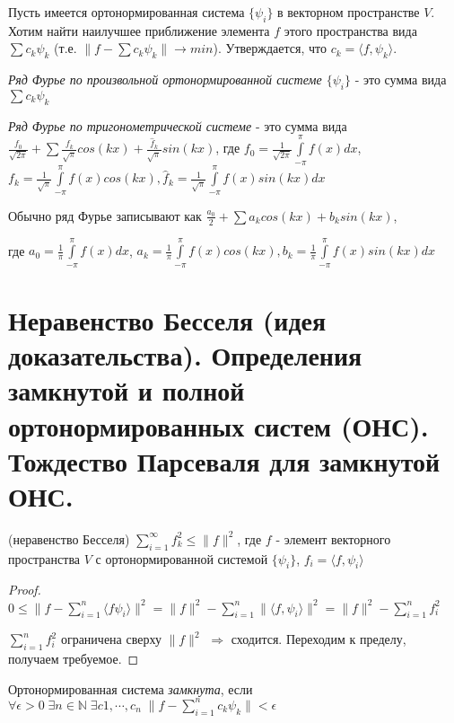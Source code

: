 \documentclass{article}
\begin{document}
	Пусть имеется ортонормированная система $\{{\psi_i}\}$ в векторном пространстве $V$. Хотим найти наилучшее приближение элемента $f$ этого пространства вида $\sum c_k \psi_k$ (т.е. $\|f-\sum c_k \psi_k\| \rightarrow min$). Утверждается, что $c_k=\langle f, \psi_k\rangle$.
	
	 \begin{definition}
	 	\textit{Ряд Фурье по произвольной ортонормированной системе $\{{\psi_i}\}$} - это сумма вида $\sum c_k \psi_k$
	 \end{definition}
 
	 \begin{definition}
	 	\textit{Ряд Фурье по тригонометрической системе} - это сумма вида $\frac{f_0}{\sqrt{2\pi}} +\sum \frac{f_k}{\sqrt{\pi}}cos(kx) + \frac{\hat f_k}{\sqrt{\pi}}sin(kx)$, где $f_0=\frac{1}{\sqrt{2\pi}}\int\limits_{-\pi}^{\pi} f(x) dx$, $f_k=\frac{1}{\sqrt{\pi}}\int\limits_{-\pi}^{\pi} f(x)cos(kx), \hat f_k=\frac{1}{\sqrt{\pi}}\int\limits_{-\pi}^{\pi} f(x)sin(kx) dx$
	 \end{definition}
 
 	Обычно ряд Фурье записывают как $\frac{a_0}{2} + \sum a_k cos(kx) + b_k sin(kx)$,
 	
 	где $a_0=\frac{1}{\pi}\int\limits_{-\pi}^{\pi} f(x) dx$, $a_k=\frac{1}{\pi}\int\limits_{-\pi}^{\pi} f(x)cos(kx), b_k=\frac{1}{\pi}\int\limits_{-\pi}^{\pi} f(x)sin(kx) dx$
	
	\section{Неравенство Бесселя (идея доказательства). Определения замкнутой и полной ортонормированных систем (ОНС). Тождество Парсеваля для замкнутой ОНС.}
	
	\begin{theorem} 
		(неравенство Бесселя) $\sum_{i=1}^{\infty} f_k^2 \le \| f \|^2$, где $f$ - элемент векторного пространства $V$ с ортонормированной системой $\{{\psi_i}\}$, $f_i = \langle f, \psi_i \rangle$ 
	\end{theorem}
	\begin{proof}
		$0 \le \| f- \sum_{i=1}^{n} \langle f \psi_i \rangle \|^2=\|f\|^2-\sum_{i=1}^{n} \|\langle f, \psi_i \rangle \|^2=\|f\|^2-\sum_{i=1}^{n} f_i ^2$ 
		
		$\sum_{i=1}^{n} f_i^2$ ограничена сверху $\|f\|^2$ $\Rightarrow$  сходится. Переходим к пределу, получаем требуемое. 
	\end{proof}

	\begin{definition}
		Ортонормированная система \textit{замкнута}, если $\forall \epsilon > 0 \; \exists n \in \mathbb{N} \; \exists c1, \cdots, c_n \; \| f-\sum_{i=1}^{n} c_k \psi_k\| < \epsilon$
	\end{definition}
\end{document}

